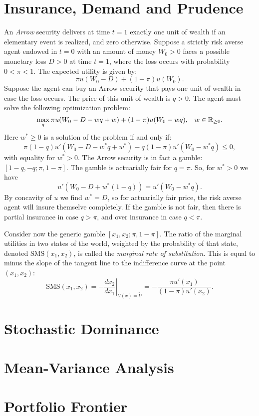 \documentclass[twoside]{article}
\begin{document}
\section{Insurance, Demand and Prudence}
An \textit{Arrow} security delivers at time $t=1$ exactly one unit of wealth if an elementary event is realized, and zero otherwise. Suppose a strictly risk averse agent endowed in $t=0$ with an amount of money $W_0>0$ faces a possible monetary loss $D>0$ at time $t=1$, where the loss occurs with probability $0 < \pi < 1$. The expected utility is given by:
\[
    \pi u(W_0 - D) + (1-\pi)u(W_0).
\]
Suppose the agent can buy an Arrow security that pays one unit of wealth in case the loss occurs. The price of this unit of wealth is $q>0$. The agent must solve the following optimization problem:
\[
    \max_{q} \pi u(W_0 - D - wq + w) + (1-\pi)u(W_0 - wq), \;\;\; w \in \mathbb{R}_{\geq 0}.
\]
Here $w^* \geq 0$ is a solution of the problem if and only if:
\[
    \pi(1-q) u'(W_0 - D - w^*q + w^*) - q(1-\pi)u'(W_0 - w^*q) \leq 0,
\]
with equality for $w^* > 0$. The Arrow security is in fact a gamble: $[1-q, -q; \pi, 1-\pi]$. The gamble is actuarially fair for $q = \pi$. So, for $w^* > 0$ we have
\[
    u'\left(W_0 - D + w^*(1-q)\right) = u'\left(W_0 - w^*q\right).
\]
By concavity of $u$ we find $w^* = D$, so for actuarially fair price, the risk averse agent will insure themselve completely. If the gamble is not fair, then there is partial insurance in case $q > \pi$, and over insurance in case $q < \pi$.

Consider now the generic gamble $[x_1, x_2; \pi, 1-\pi]$. The ratio of the marginal utilities in two states of the world, weighted by the probability of that state, denoted $\text{SMS}(x_1, x_2)$, is called the \textit{marginal rate of substitution}. This is equal to minus the slope of the tangent line to the indifference curve at the point $(x_1, x_2)$:
\[
    \text{SMS}(x_1, x_2) = \left.-\frac{dx_2}{dx_1}\right|_{U(x) = \tilde{U}} = - \frac{\pi u'(x_1)}{(1-\pi)u'(x_2)}.
\]


\section{Stochastic Dominance}

\section{Mean-Variance Analysis}

\section{Portfolio Frontier}
\end{document}
